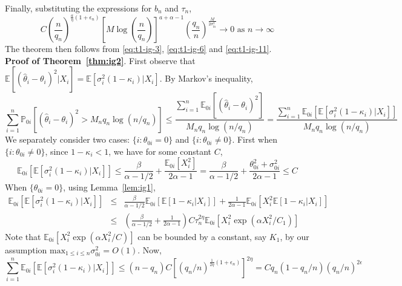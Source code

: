\documentclass[sn-basic]{sn-jnl}%
\theoremstyle{thmstyleone}%
\begin{document}
\noindent
Finally, substituting the expressions for $b_n$ and $\tau_n$,
\begin{equation}
C \left( \frac{n}{q_n} \right)^{\frac{a}{\eta}(1+\epsilon_n)} \left[M \log (\frac{n}{q_n}) \right]^{a+\alpha -1} \left( \frac{q_n}{n} \right)^{\frac{M}{2 \sigma_{0i}^2}}
\to 0 \text{ as } n \to \infty
\label{eq:t1-ig-11}
\end{equation}
\noindent
The theorem then follows from \eqref{eq:t1-ig-3}, \eqref{eq:t1-ig-6} and \eqref{eq:t1-ig-11}.\\

\noindent
\textbf{Proof of Theorem~\ref{thm:ig2}}. First observe that $\mathbb{E}[(\hat{\theta}_i-\theta_i)^2|X_i]=
\mathbb{E}[\sigma_{i}^2(1-\kappa_i)|X_i]$. By Markov's inequality,
\begin{equation}
\sum_{i=1}^n \mathbb{P}_{0i}[(\hat\theta_i-\theta_i)^2 > M_n q_n \log(n/q_n)]
\leq \frac{\sum_{i=1}^n \mathbb{E}_{0i}[(\hat\theta_i-\theta_i)^2]}{M_n q_n \log(n/q_n)}
= \frac{\sum_{i=1}^n \mathbb{E}_{0i}[\mathbb{E}[\sigma_{i}^2(1-\kappa_i)|X_i]]}{M_n q_n \log(n/q_n)}
\label{eq:t2-ig-1}
\end{equation}
\noindent
We separately consider two cases: $\{i:\theta_{0i}=0\}$ and $\{i:\theta_{0i}\neq 0\}$. First when $\{i:\theta_{0i}\neq 0\}$, since $1-\kappa_i<1$, we have for some constant $C$,
\begin{equation}
\mathbb{E}_{0i}[\mathbb{E}[\sigma_{i}^2(1-\kappa_i)|X_i]]
\leq \frac{\beta}{\alpha-1/2} + \frac{\mathbb{E}_{0i}[X_i^2]}{2\alpha-1}
= \frac{\beta}{\alpha-1/2} + \frac{\theta_{0i}^2+\sigma_{0i}^2}{2\alpha-1}
\leq C
\label{eq:t2-ig-2}
\end{equation}
\noindent
When $\{\theta_{0i}=0\}$, using Lemma~\ref{lem:ig1},
\begin{eqnarray}
\mathbb{E}_{0i}[\mathbb{E}[\sigma_i^2(1-\kappa_i)|X_i]]
&\leq&
\frac{\beta}{\alpha-1/2} \mathbb{E}_{0i}[\mathbb{E}[1-\kappa_i|X_i]] + \frac{1}{2\alpha-1} \mathbb{E}_{0i}[X_i^2\mathbb{E}[1-\kappa_i|X_i]] \nonumber \\
&\leq&
\left( \frac{\beta}{\alpha-1/2} + \frac{1}{2\alpha-1} \right) C\tau_n^{2\eta} \mathbb{E}_{0i}[X_i^2 \exp(\alpha X_i^2/C_1)]
\label{eq:t2-ig-3}
\end{eqnarray}
\noindent
Note that $\mathbb{E}_{0i}[X_i^2 \exp(\alpha X_i^2/C)]$ can be bounded by a constant, say $K_1$, by our assumption $\mbox{max}_{1\leq i\leq n}\sigma_{0i}^2=O(1)$. Now,
\begin{equation}
\sum_{i=1}^n \mathbb{E}_{0i}[\mathbb{E}[\sigma_{i}^2(1-\kappa_i)|X_i]]
\leq
(n-q_n) C [(q_n/n)^{\frac{1}{2\eta}(1+\epsilon_n)}]^{2\eta}
=
C q_n (1 - q_n/n) (q_n/n)^{2\epsilon}
\label{eq:t2-ig-4}
\end{equation}
\end{document}
